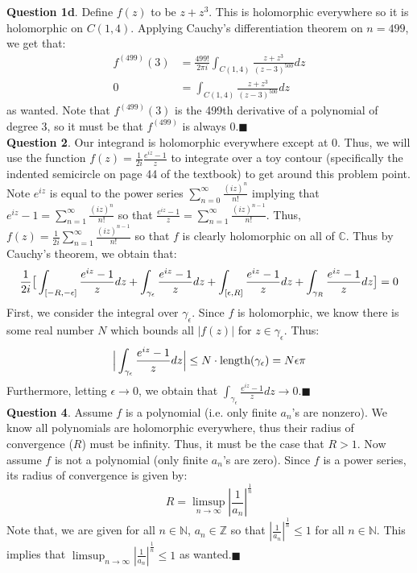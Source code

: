\documentclass{article}
\begin{document}
    \textbf{Question 1d}.
    Define $f(z)$ to be $z+z^3$. This is holomorphic everywhere so it is holomorphic on $C(1,4)$. Applying Cauchy's differentiation theorem
    on $n=499$, we get that:
    \begin{align*}
        f^{(499)}(3) &= \frac{499!}{2\pi i}\int_{C(1,4)}\frac{z+z^3}{(z-3)^{500}}dz \\
        0 &= \int_{C(1,4)}\frac{z+z^3}{(z-3)^{500}}dz
    \end{align*}
    as wanted. Note that $f^{(499)}(3)$ is the 499th derivative of a polynomial of degree 3, so it must be that $f^{(499)}$ is always 0.\hfill$\blacksquare$\\

    \textbf{Question 2}.
    Our integrand is holomorphic everywhere except at 0. Thus, we will use the function $f(z) = \frac{1}{2i}\frac{e^{iz}-1}{z}$ to integrate over a toy 
    contour (specifically the indented semicircle on page 44 of the textbook) to get around this problem point. Note $e^{iz}$ is equal to the power series
    $\sum_{n=0}^{\infty} \frac{(iz)^n}{n!}$ implying that $e^{iz}-1 = \sum_{n=1}^{\infty} \frac{(iz)^n}{n!}$ so that $\frac{e^{iz}-1}{z} = 
    \sum_{n=1}^{\infty} \frac{(iz)^{n-1}}{n!}$. Thus, $f(z) = \frac{1}{2i}\sum_{n=1}^{\infty}\frac{(iz)^{n-1}}{n!}$ so that $f$ is clearly holomorphic on
    all of $\mathbb{C}$. Thus by Cauchy's theorem, we obtain that:
    \[ \frac{1}{2i}\big{[}\int_{[-R,-\epsilon]}\frac{e^{iz}-1}{z}dz + \int_{\gamma_{\epsilon}}\frac{e^{iz}-1}{z}dz + \int_{[\epsilon,R]}\frac{e^{iz}-1}{z}dz
        + \int_{\gamma_R} \frac{e^{iz}-1}{z}dz\big{]} = 0\]
    First, we consider the integral over $\gamma_{\epsilon}$. Since $f$ is holomorphic, we know there is some real number $N$ which bounds all $|f(z)|$ for
    $z\in\gamma_{\epsilon}$. Thus:
    \[ \Big{|}\int_{\gamma_{\epsilon}} \frac{e^{iz}-1}{z}dz\Big{|} \leq N\cdot \text{length}(\gamma_{\epsilon}) = N\epsilon\pi \]
    Furthermore, letting $\epsilon\to 0$, we obtain that $\int_{\gamma_{\epsilon}}\frac{e^{iz}-1}{z}dz \to 0$.\hfill$\blacksquare$\\

    \textbf{Question 4}.
    Assume $f$ is a polynomial (i.e. only finite $a_n$'s are nonzero). We know all polynomials are holomorphic everywhere, thus their radius of convergence 
    ($R$) must be infinity. Thus, it must
    be the case that $R > 1$. Now assume $f$ is not a polynomial (only finite $a_n$'s are zero). Since $f$ is a power series, its radius of convergence is given by:
    \[ R = \limsup_{n\to\infty} |\frac{1}{a_n}|^{\frac{1}{n}} \]
    Note that, we are given for all $n\in\mathbb{N}$, $a_n\in\mathbb{Z}$ so that $|\frac{1}{a_n}|^{\frac{1}{n}}\leq 1$ for all $n\in\mathbb{N}$. This implies that
    $\limsup_{n\to\infty} |\frac{1}{a_n}|^{\frac{1}{n}}\leq 1$ as wanted.\hfill$\blacksquare$\\
\end{document}

